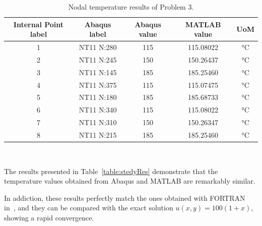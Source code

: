 \begin{table}[H]
    \centering 
    \begin{tabular}{ccccc}
    \hline
    \rowcolor{bluepoli!40} %
    Internal Point label & Abaqus label & Abaqus value & MATLAB value & UoM \\
    \hline
    1 & NT11 N:280 & 115 & 115.08022 & °C \\
    2 & NT11 N:245 & 150 & 150.26437 & °C \\
    3 & NT11 N:145 & 185 & 185.25460 & °C \\
    4 & NT11 N:375 & 115 & 115.07475 & °C \\
    5 & NT11 N:180 & 185 & 185.68733 & °C \\
    6 & NT11 N:340 & 115 & 115.08022 & °C \\
    7 & NT11 N:310 & 150 & 150.26347 & °C \\
    8 & NT11 N:215 & 185 & 185.25460 & °C \\
    \hline
    \end{tabular}
    \\[10pt]
    \caption{Nodal temperature results of Problem 3.}
    \label{table:stedyRes2}
\end{table}

The results presented in Table~\ref{table:stedyRes} demonstrate that the temperature values obtained from Abaqus and MATLAB are remarkably similar.

In addiction, these results perfectly match the ones obtained with FORTRAN in~\cite{sbemKatsi}, and they can be compared with the exact solution $u(x,y)=100(1+x)$, showing a rapid convergence.



